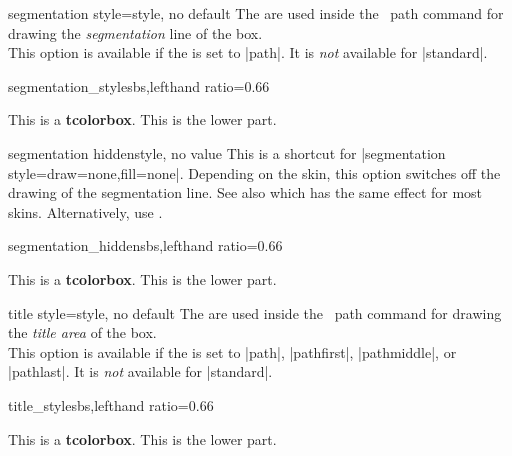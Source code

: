 \clearpage
\begin{docTcbKey}{segmentation style}{=}{style, no default}
  The  are used inside the \tikzname\ path command
  for drawing the \emph{segmentation} line of the box.\\
  This option is available if the 
  is set to |path|.
  It is \emph{not} available for |standard|.
\begin{exdispExample*}{segmentation_style}{sbs,lefthand ratio=0.66}

\begin{tcolorbox}[enhanced,title=My title,
  segmentation style={double=white,draw=blue,
                  double distance=1pt,solid}]
This is a \textbf{tcolorbox}.
\tcblower
This is the lower part.
\end{tcolorbox}
\end{exdispExample*}
\end{docTcbKey}


\begin{docTcbKey}{segmentation hidden}{}{style, no value}
  This is a shortcut for |segmentation style={draw=none,fill=none}|.
  Depending on the skin, this option switches off the drawing of the
  segmentation line. See also  which
  has the same effect for most skins.
  Alternatively, use .
\begin{exdispExample*}{segmentation_hidden}{sbs,lefthand ratio=0.66}

\begin{tcolorbox}[title=My title,
  enhanced,segmentation hidden]
This is a \textbf{tcolorbox}.
\tcblower
This is the lower part.
\end{tcolorbox}
\end{exdispExample*}
\end{docTcbKey}


\begin{docTcbKey}{title style}{=}{style, no default}
  The  are used inside the \tikzname\ path command
  for drawing the \emph{title area} of the box.\\
  This option is available if the  is set to
  |path|, |pathfirst|, |pathmiddle|, or |pathlast|.
  It is \emph{not} available for |standard|.
\begin{exdispExample*}{title_style}{sbs,lefthand ratio=0.66}

\begin{tcolorbox}[enhanced,title=My title,
  title style={left color=blue!15!yellow,
               right color=red!85!black}]
This is a \textbf{tcolorbox}.
\tcblower
This is the lower part.
\end{tcolorbox}
\end{exdispExample*}
\end{docTcbKey}

